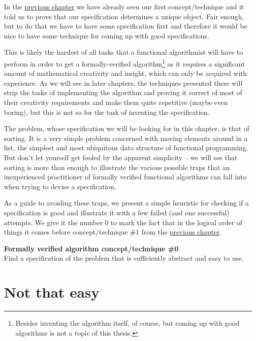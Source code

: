 \documentclass[declaration,mgr,english,shortabstract]{iithesis}
\begin{document}
In the \hyperref[introduction]{previous chapter} we have already seen our first concept/technique and it told us to prove that our specification determines a unique object. Fair enough, but to do that we have to have some specification first and therefore it would be nice to have some technique for coming up with good specifications.

This is likely the hardest of all tasks that a functional algorithmist will have to perform in order to get a formally-verified algorithm\footnote{Besides inventing the algorithm itself, of course, but coming up with good algorithms is not a topic of this thesis.} as it requires a significant amount of mathematical creativity and insight, which can only be acquired with experience. As we will see in later chapters, the techniques presented there will strip the tasks of implementing the algorithm and proving it correct of most of their creativity requirements and make them quite repetitive (maybe even boring), but this is not so for the task of inventing the specification.

The problem, whose specification we will be looking for in this chapter, is that of sorting. It is a very simple problem concerned with moving elements around in a list, the simplest and most ubiquitous data structure of functional programming. But don't let yourself get fooled by the apparent simplicity -- we will see that sorting is more than enough to illustrate the various possible traps that an inexperienced practitioner of formally verified functional algorithms can fall into when trying to devise a specification.

As a guide to avoiding these traps, we present a simple heuristic for checking if a specification is good and illustrate it with a few failed (and one successful) attempts. We give it the number $0$ to mark the fact that in the logical order of things it comes before concept/technique $\#1$ from the \hyperref[introduction]{previous chapter}.

\begin{center}
    \textbf{Formally verified algorithm concept/technique \#0} \\
    Find a specification of the problem that is sufficiently abstract and easy to use.
\end{center}

\section{Not that easy} \label{noteasy}
\end{document}
